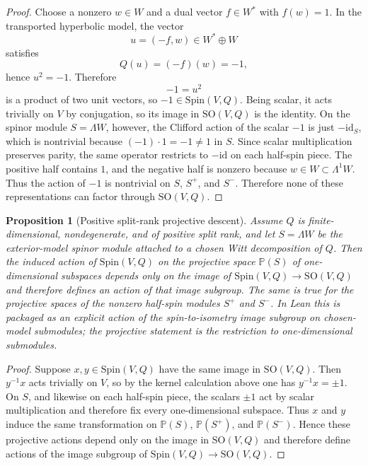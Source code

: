 \documentclass{birkjour}
\theoremstyle{plain}
\newtheorem{proposition}[theorem]{Proposition}
\theoremstyle{definition}
\theoremstyle{remark}
\newcommand{\Spin}{\mathrm{Spin}}
\newcommand{\SO}{\mathrm{SO}}
\newcommand{\wedgeW}{\Lambda W}
\begin{document}
\begin{proof}
Choose a nonzero $w\in W$ and a dual vector $f\in W^*$ with $f(w)=1$. In the
transported hyperbolic model, the vector
\[
  u=(-f,w)\in W^*\oplus W
\]
satisfies
\[
  Q(u)=(-f)(w)=-1,
\]
hence $u^2=-1$. Therefore
\[
  -1=u^2
\]
is a product of two unit vectors, so $-1\in \Spin(V,Q)$. Being scalar, it acts
trivially on $V$ by conjugation, so its image in $\SO(V,Q)$ is the identity.
On the spinor module $S=\wedgeW$, however, the Clifford action of the
scalar $-1$ is just $-\mathrm{id}_S$, which is nontrivial because
$(-1)\cdot 1=-1\neq 1$ in $S$. Since scalar multiplication preserves parity,
the same operator restricts to $-\mathrm{id}$ on each half-spin piece. The
positive half contains $1$, and the negative half is nonzero because
$w\in W\subset \Lambda^1 W$. Thus the action of $-1$ is nontrivial on $S$,
$S^+$, and $S^-$. Therefore none of these representations can factor through
$\SO(V,Q)$.
\end{proof}

\begin{proposition}[Positive split-rank projective descent]
\label{prop:projective-descent}
Assume $Q$ is finite-dimensional, nondegenerate, and of positive split rank,
and let $S=\wedgeW$ be the exterior-model spinor module attached to a
chosen Witt decomposition of $Q$. Then the induced action of $\Spin(V,Q)$ on
the projective space $\mathbb{P}(S)$ of one-dimensional subspaces depends only
on the image of $\Spin(V,Q)\to\SO(V,Q)$ and therefore defines an action of
that image subgroup. The same is true for the projective spaces of the nonzero
half-spin modules $S^+$ and $S^-$. In Lean this is packaged as an explicit
action of the spin-to-isometry image subgroup on chosen-model submodules; the
projective statement is the restriction to one-dimensional submodules.
\end{proposition}

\begin{proof}
Suppose $x,y\in \Spin(V,Q)$ have the same image in $\SO(V,Q)$. Then
$y^{-1}x$ acts trivially on $V$, so by the kernel calculation above one has
$y^{-1}x=\pm1$. On $S$, and likewise on each half-spin piece, the scalars
$\pm1$ act by scalar multiplication and therefore fix every one-dimensional
subspace. Thus $x$ and $y$ induce the same transformation on
$\mathbb{P}(S)$, $\mathbb{P}(S^+)$, and $\mathbb{P}(S^-)$. Hence these
projective actions depend only on the image in $\SO(V,Q)$ and therefore define
actions of the image subgroup of $\Spin(V,Q)\to\SO(V,Q)$.
\end{proof}
\end{document}
